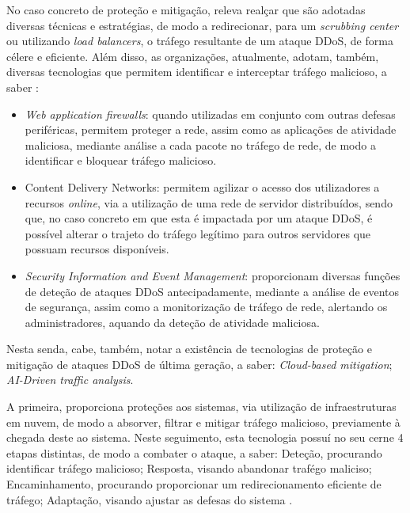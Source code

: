 No caso concreto de proteção e mitigação, releva realçar que são adotadas diversas técnicas e estratégias, de modo a redirecionar, para um \textit{scrubbing center} ou utilizando \textit{load balancers}, o tráfego resultante de um ataque DDoS, de forma célere e eficiente. Além disso, as organizações, atualmente, adotam, também, diversas tecnologias que permitem identificar e interceptar tráfego malicioso, a saber \cite{ibm_what_is_ddos}:
\begin{itemize}
    \item \textit{Web application firewalls}: quando utilizadas em conjunto com outras defesas periféricas, permitem proteger a rede, assim como as aplicações de atividade maliciosa, mediante análise a cada pacote no tráfego de rede, de modo a identificar e bloquear tráfego malicioso.
    \item Content Delivery Networks: permitem agilizar o acesso dos utilizadores a recursos \textit{online}, via a utilização de uma rede de servidor distribuídos, sendo que, no caso concreto em que esta é impactada por um ataque DDoS, é possível alterar o trajeto do tráfego legítimo para outros servidores que possuam recursos disponíveis.
    \item \textit{Security Information and Event Management}: proporcionam diversas funções de deteção de ataques DDoS antecipadamente, mediante a análise de eventos de segurança, assim como a monitorização de tráfego de rede, alertando os administradores, aquando da deteção de atividade maliciosa.
\end{itemize}

Nesta senda, cabe, também, notar a existência de tecnologias de proteção e mitigação de ataques DDoS de última geração, a saber: \textit{Cloud-based mitigation}; \textit{AI-Driven traffic analysis}.


A primeira, proporciona proteções aos sistemas, via utilização de infraestruturas em nuvem, de modo a absorver, filtrar e mitigar tráfego malicioso, previamente à chegada deste ao sistema. Neste seguimento, esta tecnologia possuí no seu cerne 4 etapas distintas, de modo a combater o ataque, a saber: Deteção, procurando identificar tráfego malicioso; Resposta, visando abandonar trafégo maliciso; Encaminhamento, procurando proporcionar um redirecionamento eficiente de tráfego; Adaptação, visando ajustar as defesas do sistema \cite{cloudflare_cloud_based_protection}.


